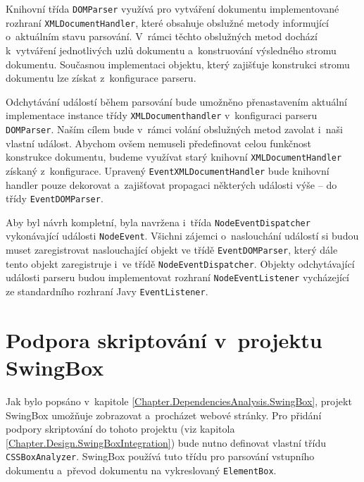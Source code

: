 Knihovní třída \texttt{DOMParser} využívá pro vytváření dokumentu implementované rozhraní \texttt{XMLDocumentHandler}, které obsahuje obslužné metody informující o~aktuálním stavu parsování. V~rámci těchto obslužných metod dochází k~vytváření jednotlivých uzlů dokumentu a~konstruování výsledného stromu dokumentu. Současnou implementaci objektu, který zajišťuje konstrukci stromu dokumentu lze získat z~konfigurace parseru.

Odchytávání událostí během parsování bude umožněno přenastavením aktuální implementace instance třídy \texttt{XMLDocumenthandler} v~konfiguraci parseru \texttt{DOMParser}. Naším cílem bude v~rámci volání obslužných metod zavolat i~naši vlastní událost. Abychom ovšem nemuseli předefinovat celou funkčnost konstrukce dokumentu, budeme využívat starý knihovní \texttt{XMLDocumentHandler} získaný z~konfigurace. Upravený \texttt{EventXMLDocumentHandler} bude knihovní handler pouze dekorovat a~zajišťovat propagaci některých události výše -- do třídy \texttt{EventDOMParser}. 

Aby byl návrh kompletní, byla navržena i~třída \texttt{NodeEventDispatcher} vykonávající události \texttt{NodeEvent}. Všichni zájemci o~naslouchání událostí si budou muset zaregistrovat naslouchající objekt ve třídě \texttt{EventDOMParser}, který dále tento objekt zaregistruje i~ve třídě \texttt{NodeEventDispatcher}. Objekty odchytávající události parseru budou implementovat rozhraní \texttt{NodeEventListener} vycházející ze standardního rozhraní Javy \texttt{EventListener}.

\section{Podpora skriptování v~projektu SwingBox}
\label{Chapter.Design.ScriptsInSwingBox}

Jak bylo popsáno v~kapitole \ref{Chapter.DependenciesAnalysis.SwingBox}, projekt SwingBox umožňuje zobrazovat a~procházet webové stránky. Pro přidání podpory skriptování do tohoto projektu (viz kapitola \ref{Chapter.Design.SwingBoxIntegration}) bude nutno definovat vlastní třídu \texttt{CSSBoxAnalyzer}. SwingBox používá tuto třídu pro parsování vstupního dokumentu a~převod dokumentu na vykreslovaný \texttt{ElementBox}.   

